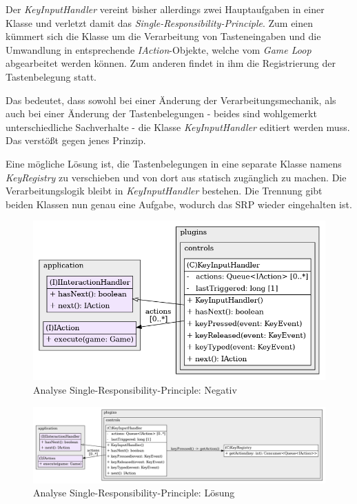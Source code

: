 Der \textit{KeyInputHandler} vereint bisher allerdings zwei
Hauptaufgaben in einer Klasse und verletzt damit das
\textit{Single-Responsibility-Principle}. Zum einen kümmert sich die
Klasse um die Verarbeitung von Tasteneingaben und die Umwandlung in
entsprechende \textit{IAction}-Objekte, welche vom \textit{Game Loop}
abgearbeitet werden können. Zum anderen findet in ihm die Registrierung
der Tastenbelegung statt. 

Das bedeutet, dass sowohl bei einer Änderung der Verarbeitungsmechanik,
als auch bei einer Änderung der Tastenbelegungen - beides sind wohlgemerkt
unterschiedliche Sachverhalte - die Klasse \textit{KeyInputHandler}
editiert werden muss. Das verstößt gegen jenes Prinzip.

Eine mögliche Lösung ist, die Tastenbelegungen in eine separate
Klasse namens \textit{KeyRegistry} zu verschieben und von dort aus
statisch zugänglich zu machen. Die Verarbeitungslogik bleibt in
\textit{KeyInputHandler} bestehen. Die Trennung gibt beiden Klassen
nun genau eine Aufgabe, wodurch das SRP wieder eingehalten ist.

\vspace{0.5cm}
\begin{figure}[H]
    \centering
    \includegraphics[width=0.7\linewidth]{Bilder/Visualisierung/KeyInputHandler_structureSRPViolation.png}
    \caption{Analyse Single-Responsibility-Principle: Negativ}
\end{figure}

\vspace{0.5cm}
\begin{figure}[H]
    \centering
    \includegraphics[width=1\linewidth]{Bilder/Visualisierung/KeyInputHandlerWithRegistry_structure.png}
    \caption{Analyse Single-Responsibility-Principle: Lösung}
\end{figure}

